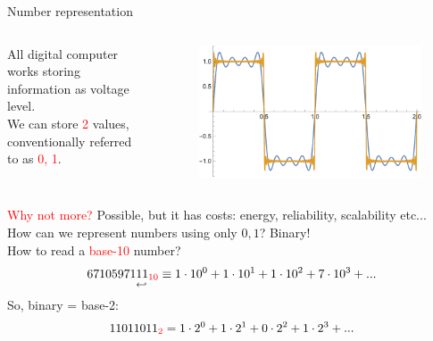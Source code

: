\documentclass[10pt]{beamer}
\newcommand{\red}[1]{\textcolor{red}{#1}}
\renewcommand{\[}{\begin{equation*}}
\renewcommand{\]}{\end{equation*}}
\begin{document}
\begin{frame}{Number representation}
\begin{columns}
\begin{column}{0.5\textwidth}
All digital computer works storing information as voltage level.\\
We can store \red{2} values, conventionally referred to as \red{0, 1}.
\end{column}

\begin{column}{0.5\textwidth}
\begin{figure}
\centering
\includegraphics[width=\textwidth]{Notes/Figures/square_wave.pdf}
\end{figure}
\end{column}
\end{columns}
\pause
\red{Why not more?} Possible, but it has costs: energy, reliability, scalability etc... \\
How can we represent numbers using only $0,1$? Binary!\\
How to read a \red{base-10} number?
\[
\underset{\quad \quad \quad \hookleftarrow}{6710597111_{\red{10}}} \equiv 1 \cdot 10^0 +  1 \cdot 10^1 + 1 \cdot 10^2 + 7 \cdot 10^3 +...
\]
So, binary = base-2:
\[
11011011_{\red{2}} = 1 \cdot 2^0 + 1 \cdot 2^1 + 0 \cdot 2^2 + 1 \cdot 2^3 +  ...
\]

\end{frame}
\end{document}

